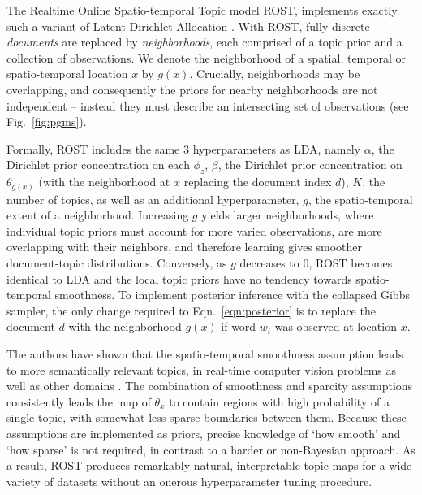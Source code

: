 The Realtime Online Spatio-temporal Topic model ROST, implements exactly such a variant of Latent Dirichlet Allocation \citep{Girdhar2014}. With ROST, fully discrete \emph{documents} are replaced by \emph{neighborhoods}, each comprised of a topic prior and a collection of observations. We denote the neighborhood of a spatial, temporal or spatio-temporal location $x$ by $g(x)$. Crucially, neighborhoods may be overlapping, and consequently the priors for nearby neighborhoods are not independent -- instead they must describe an intersecting set of observations (see Fig.~\ref{fig:pgms}).

Formally, ROST includes the same 3 hyperparameters as LDA, namely $\alpha$, the Dirichlet prior concentration on each $\phi_z$, $\beta$, the Dirichlet prior concentration on $\theta_{g(x)}$ (with the neighborhood at $x$ replacing the document index $d$), $K$, the number of topics, as well as an additional hyperparameter, $g$, the spatio-temporal extent of a neighborhood. Increasing $g$ yields larger neighborhoods, where individual topic priors must account for more varied observations, are more overlapping with their neighbors, and therefore learning gives smoother document-topic distributions. Conversely, as $g$ decreases to 0, ROST becomes identical to LDA and the local topic priors have no tendency towards spatio-temporal smoothness. To implement posterior inference with the collapsed Gibbs sampler, the only change required to Eqn.~\ref{eqn:posterior} is to replace the document $d$ with the neighborhood $g(x)$ if word $w_i$ was observed at location $x$. 

The authors have shown that the spatio-temporal smoothness assumption leads to more semantically relevant topics, in real-time computer vision problems as well as other domains \citep{Girdhar2012, Girdhar2014a, Girdhar2016}. The combination of smoothness and sparcity assumptions consistently leads the map of $\theta_x$ to contain regions with high probability of a single topic, with somewhat less-sparse boundaries between them. Because these assumptions are implemented as priors, precise knowledge of `how smooth' and `how sparse' is not required, in contrast to a harder or non-Bayesian approach. As a result, ROST produces remarkably natural, interpretable topic maps for a wide variety of datasets without an onerous hyperparameter tuning procedure.

